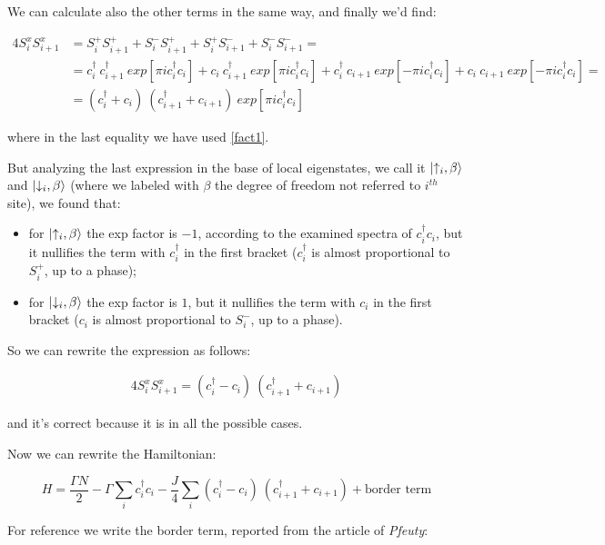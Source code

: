 \documentclass[a4paper,10pt]{article}
\begin{document}
We can calculate also the other terms in the same way, and finally we'd find:

\begin{align*}
4 S_i^x S_{i+1}^x &= S_i^+ S_{i+1}^+ + S_i^- S_{i+1}^+ + S_i^+ S_{i+1}^- + S_i^- S_{i+1}^- = \\
&= c_i^\dagger~c_{i+1}^\dagger~exp[\pi i c_i^\dagger c_i] + c_i~c_{i+1}^\dagger~exp[\pi i c_i^\dagger c_i] + c_i^\dagger~c_{i+1}~exp[-\pi i c_i^\dagger c_i] + c_i~c_{i+1}~exp[-\pi i c_i^\dagger c_i] =\\
&= (c_i^\dagger + c_i)~(c_{i+1}^\dagger + c_{i+1})~exp[\pi i c_i^\dagger c_i]
\end{align*}

\noindent where in the last equality we have used \cref{fact1}.

But analyzing the last expression in the base of local eigenstates, we call it $\ket{\uparrow_i, \beta}$ and $\ket{\downarrow_i, \beta}$ (where we labeled with $\beta$ the degree of freedom not referred to $i^{th}$ site), we found that:
\begin{itemize}
	\item for $\ket{\uparrow_i, \beta}$ the exp factor is $-1$, according to the examined spectra of $c_i^\dagger c_i$, but it nullifies the term with $c_i^\dagger$ in the first bracket ($c_i^\dagger$ is almost proportional to $S_i^+$, up to a phase);
	\item for $\ket{\downarrow_i, \beta}$ the exp factor is $1$, but it nullifies the term with $c_i$ in the first bracket ($c_i$ is almost proportional to $S_i^-$, up to a phase).
\end{itemize}

\noindent So we can rewrite the expression as follows:

\begin{align*}
4 S_i^x S_{i+1}^x = (c_i^\dagger - c_i)~(c_{i+1}^\dagger + c_{i+1})
\end{align*}

\noindent and it's correct because it is in all the possible cases.

Now we can rewrite the Hamiltonian:

\begin{equation}
	H = \frac{\Gamma N}{2} - \Gamma \sum_i c_i^\dagger c_i - \frac{J}{4} \sum_i (c_i^\dagger - c_i)~(c_{i+1}^\dagger + c_{i+1}) + \text{border term}
	\label{eq:HamiltonianCC}
\end{equation}

\noindent For reference we write the border term, reported from the article of \textit{Pfeuty}:
\end{document}
